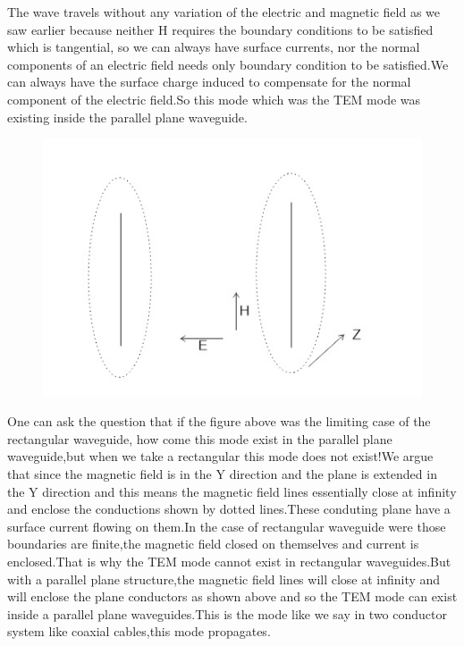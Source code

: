 The wave travels without any variation of the electric and magnetic field as we saw earlier because neither H requires the boundary conditions to be satisfied which is tangential, so we can always have surface currents, nor the normal components of an electric field needs only boundary condition to be satisfied.We can always have the surface charge induced to compensate for the normal component of the electric field.So this mode which was the TEM mode was existing inside the parallel plane waveguide.
\begin{figure}[h]
\centering
\includegraphics[width=.7\linewidth]{./graphics/page4}
\caption{}
\end{figure}
One can ask the question that if the figure above was the limiting case of the rectangular waveguide, how come this mode exist in the parallel plane waveguide,but when we take a rectangular this mode does not exist!We argue that since the magnetic field is in the Y direction and the plane is extended in the Y direction and this means the magnetic field lines essentially close at infinity and enclose the conductions shown by dotted lines.These conduting plane have a surface current flowing on them.In the case of rectangular waveguide were those boundaries are finite,the magnetic field closed on themselves and current is enclosed.That is why the TEM mode cannot exist in rectangular waveguides.But with a parallel plane structure,the magnetic field lines will close at infinity and will enclose the plane conductors as shown above and so the TEM mode can exist inside a parallel plane waveguides.This is the mode like we say in two conductor system like coaxial cables,this mode propagates.

